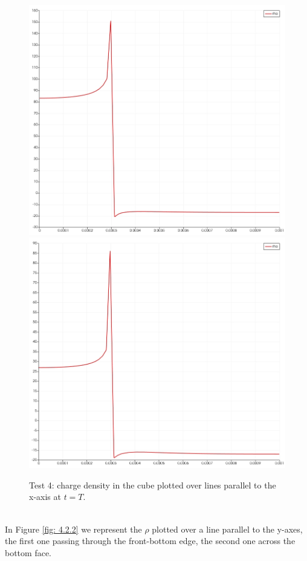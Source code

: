 \documentclass{Configuration_Files/PoliMi3i_thesis}
\begin{document}
\begin{figure}[h!]
    \centering
   \includegraphics[scale=0.2]{Images/4.rho_x.jpeg}
   \includegraphics[scale=0.2]{Images/4.rho_x2.jpeg}
    \caption {Test 4: charge density in the cube plotted over lines parallel to the x-axis at $t=T$.}
    \label{fig: 4.2.1}
\end{figure}
\\In Figure \ref{fig: 4.2.2} we represent the $\rho$ plotted over a line parallel to the y-axes, the first one passing through the front-bottom edge, the second one across the bottom face.
\end{document}
